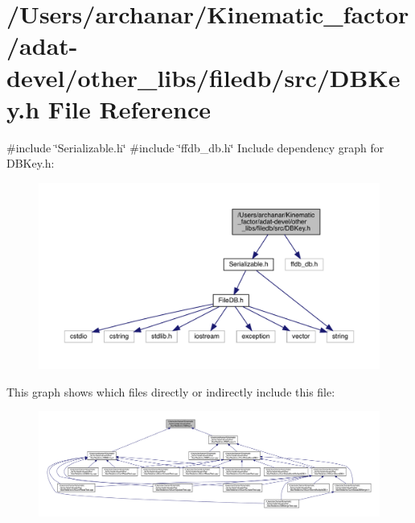 \hypertarget{adat-devel_2other__libs_2filedb_2src_2DBKey_8h}{}\section{/\+Users/archanar/\+Kinematic\+\_\+factor/adat-\/devel/other\+\_\+libs/filedb/src/\+D\+B\+Key.h File Reference}
\label{adat-devel_2other__libs_2filedb_2src_2DBKey_8h}
{\ttfamily \#include \char`\"{}Serializable.\+h\char`\"{}}\newline
{\ttfamily \#include \char`\"{}ffdb\+\_\+db.\+h\char`\"{}}\newline
Include dependency graph for D\+B\+Key.\+h\+:
\nopagebreak
\begin{figure}[H]
\begin{center}
\leavevmode
\includegraphics[width=350pt]{dc/d9c/adat-devel_2other__libs_2filedb_2src_2DBKey_8h__incl}
\end{center}
\end{figure}
This graph shows which files directly or indirectly include this file\+:
\nopagebreak
\begin{figure}[H]
\begin{center}
\leavevmode
\includegraphics[width=350pt]{d8/ddc/adat-devel_2other__libs_2filedb_2src_2DBKey_8h__dep__incl}
\end{center}
\end{figure}
